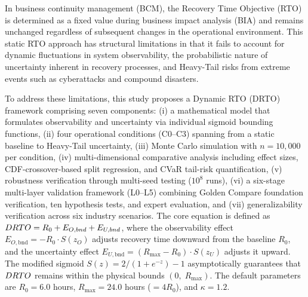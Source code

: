 {\fontsize{11}{22}\selectfont
{}\justifying
\setlength{\parindent}{2em}

In business continuity management (BCM), the Recovery Time Objective (RTO) is determined as a fixed value during business impact analysis (BIA) and remains unchanged regardless of subsequent changes in the operational environment. This static RTO approach has structural limitations in that it fails to account for dynamic fluctuations in system observability, the probabilistic nature of uncertainty inherent in recovery processes, and Heavy-Tail risks from extreme events such as cyberattacks and compound disasters.

To address these limitations, this study proposes a Dynamic RTO (DRTO) framework comprising seven components: (i) a mathematical model that formulates observability and uncertainty via individual sigmoid bounding functions, (ii) four operational conditions (C0--C3) spanning from a static baseline to Heavy-Tail uncertainty, (iii) Monte Carlo simulation with $n = 10{,}000$ per condition, (iv) multi-dimensional comparative analysis including effect sizes, CDF-crossover-based split regression, and CVaR tail-risk quantification, (v) robustness verification through multi-seed testing ($10^8$ runs), (vi) a six-stage multi-layer validation framework (L0--L5) combining Golden Compare foundation verification, ten hypothesis tests, and expert evaluation, and (vii) generalizability verification across six industry scenarios. The core equation is defined as $DRTO = R_0 + E_{O,bnd} + E_{U,bnd}$, where the observability effect $E_{O,\mathrm{bnd}} = -R_0 \cdot S(z_O)$ adjusts recovery time downward from the baseline $R_0$, and the uncertainty effect $E_{U,\mathrm{bnd}} = (R_{\max} - R_0) \cdot S(z_U)$ adjusts it upward. The modified sigmoid $S(z) = 2/(1 + e^{-z}) - 1$ asymptotically guarantees that $DRTO$ remains within the physical bounds $(0,\; R_{\max})$. The default parameters are $R_0 = 6.0$ hours, $R_{\max} = 24.0$ hours ($= 4R_0$), and $\kappa = 1.2$. 

}
